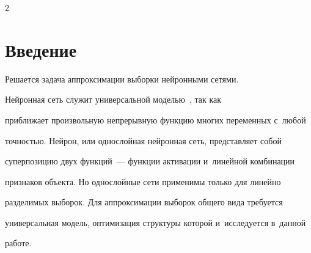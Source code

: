 \begin{multicols}{2}





\label{st\stat}











\section{Введение}





\vspace*{-3pt}





Решается задача аппроксимации выборки нейронными сетями.














Нейронная сеть служит универсальной моделью~\cite{sixth,third}, так как 


приближает произвольную непрерывную функцию многих \mbox{переменных} с~любой 


точностью. Нейрон, или однослойная нейронная сеть, представляет собой 


суперпозицию двух функций~--- функции активации и~линейной комбинации 


признаков объекта. Но однослойные сети применимы только для линейно 


разделимых выборок. Для аппроксимации выборок общего вида требуется 


универсальная модель, оптимизация структуры которой и~исследуется в~данной 


работе.





\smallskip






\end{multicols}
